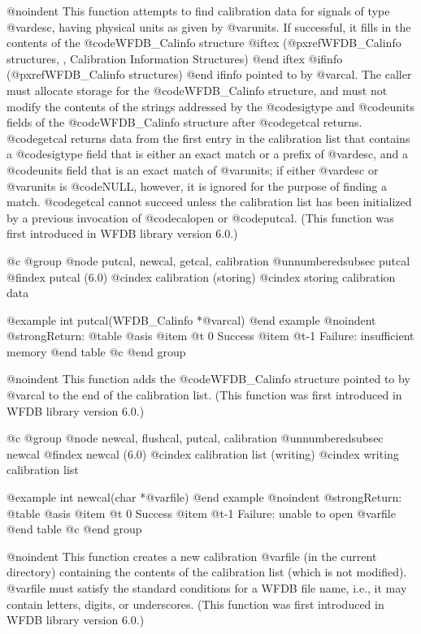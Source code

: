 {{{{{{{{{@noindent
This function attempts to find calibration data for signals of type
@var{desc}, having physical units as given by @var{units}.  If
successful, it fills in the contents of the @code{WFDB_Calinfo} structure
@iftex
(@pxref{WFDB_Calinfo structures, , Calibration Information Structures})
@end iftex
@ifinfo
(@pxref{WFDB_Calinfo structures})
@end ifinfo
pointed to by @var{cal}.  The caller must allocate storage for the
@code{WFDB_Calinfo} structure, and must not modify the contents of the
strings addressed by the @code{sigtype} and @code{units} fields of the
@code{WFDB_Calinfo} structure after @code{getcal} returns.  @code{getcal}
returns data from the first entry in the calibration list that contains
a @code{sigtype} field that is either an exact match or a prefix of
@var{desc}, and a @code{units} field that is an exact match of
@var{units}; if either @var{desc} or @var{units} is @code{NULL},
however, it is ignored for the purpose of finding a match.
@code{getcal} cannot succeed unless the calibration list has been
initialized by a previous invocation of @code{calopen} or @code{putcal}.
(This function was first introduced in WFDB library version 6.0.)

@c @group
@node    putcal, newcal, getcal, calibration
@unnumberedsubsec putcal
@findex putcal (6.0)
@cindex calibration (storing)
@cindex storing calibration data

@example
int putcal(WFDB_Calinfo *@var{cal})
@end example
@noindent
@strong{Return:}
@table @asis
@item @t{ 0}
Success
@item @t{-1}
Failure: insufficient memory
@end table
@c @end group

@noindent
This function adds the @code{WFDB_Calinfo} structure pointed to by @var{cal}
to the end of the calibration list.  (This function was first introduced
in WFDB library version 6.0.)

@c @group
@node    newcal, flushcal, putcal, calibration
@unnumberedsubsec newcal
@findex newcal (6.0)
@cindex calibration list (writing)
@cindex writing calibration list

@example
int newcal(char *@var{file})
@end example
@noindent
@strong{Return:}
@table @asis
@item @t{ 0}
Success
@item @t{-1}
Failure: unable to open @var{file}
@end table
@c @end group

@noindent
This function creates a new calibration @var{file} (in the current
directory) containing the contents of the calibration list (which is not
modified).  @var{file} must satisfy the standard conditions for a WFDB
file name, i.e., it may contain letters, digits, or underscores.  (This
function was first introduced in WFDB library version 6.0.)

}}}}}}}}}
